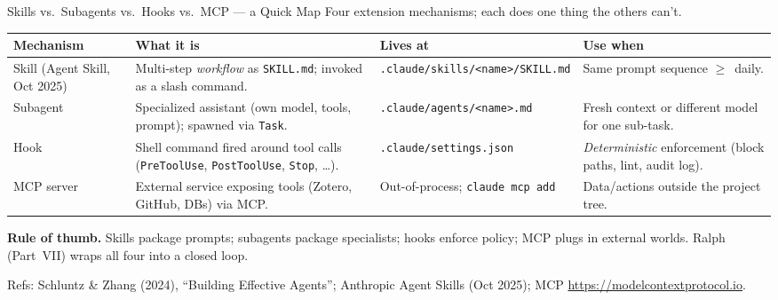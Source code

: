 \documentclass[aspectratio=169,10pt]{beamer}
\newcommand{\emphc}[1]{\textcolor{harvardcrimson}{#1}}
\begin{document}
\begin{frame}{Skills vs.\ Subagents vs.\ Hooks vs.\ MCP --- a Quick Map}
\scriptsize
Four extension mechanisms; each does one thing the others can't.

\vspace{0.3em}
\renewcommand{\arraystretch}{1.15}
\begin{tabular}{p{1.6cm} p{3.7cm} p{2.9cm} p{3.4cm}}
\toprule
\textbf{Mechanism} & \textbf{What it is} & \textbf{Lives at} & \textbf{Use when} \\
\midrule
\emphc{Skill} (Agent Skill, Oct 2025) &
  Multi-step \emph{workflow} as \texttt{SKILL.md}; invoked as a slash command. &
  \texttt{.claude/skills/<name>/SKILL.md} &
  Same prompt sequence $\geq$~daily. \\
\emphc{Subagent} &
  Specialized assistant (own model, tools, prompt); spawned via \texttt{Task}. &
  \texttt{.claude/agents/<name>.md} &
  Fresh context or different model for one sub-task. \\
\emphc{Hook} &
  Shell command fired around tool calls (\texttt{PreToolUse}, \texttt{Post\-ToolUse}, \texttt{Stop}, \dots). &
  \texttt{.claude/settings.json} &
  \emph{Deterministic} enforcement (block paths, lint, audit log). \\
\emphc{MCP server} &
  External service exposing tools (Zotero, GitHub, DBs) via MCP. &
  Out-of-process; \texttt{claude mcp add} &
  Data/actions outside the project tree. \\
\bottomrule
\end{tabular}

\vspace{0.3em}
\textbf{Rule of thumb.} Skills package prompts; subagents package specialists;
hooks enforce policy; MCP plugs in external worlds. \emphc{Ralph} (Part~VII)
wraps all four into a closed loop.

\vspace{0.1em}
{\tiny Refs: Schluntz \& Zhang (2024), ``Building Effective Agents''; Anthropic Agent Skills (Oct 2025); MCP \url{https://modelcontextprotocol.io}.}
\end{frame}
\end{document}
